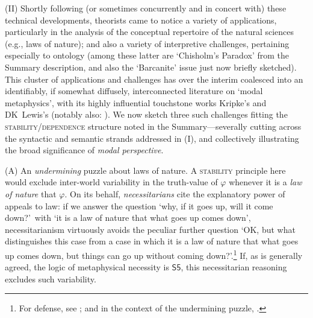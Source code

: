 \documentclass[12pt]{article}
\begin{document}
\smallskip{}

(II) Shortly following (or sometimes concurrently and in concert with) these
technical developments, theorists came to notice a variety of applications,
particularly in the analysis of the conceptual repertoire of the natural
sciences (e.g., laws of nature); and also a variety of interpretive challenges, pertaining especially
to ontology (among these latter are `Chisholm's Paradox' from the Summary
description, and also the `Barcanite' issue just now briefly sketched). This
cluster of applications and challenges has over the interim coalesced into an
identifiably, if somewhat diffusely, interconnected literature on `modal
metaphysics', with its highly influential touchstone works Kripke's
\citep{kripke72} and DK~Lewis's \citep{lewis86} (notably also:
\citep{Plantinga1974-PLATNO,VanInwagen1990-VANMB,sider01,finetime,Hawthorne2006-HAWME}).
We now sketch three such challenges fitting the
\textsc{stability}/\textsc{dependence} structure noted in the
Summary---severally cutting across the syntactic and semantic strands
addressed in (I), and collectively illustrating the broad significance of
\emph{modal perspective}.

(A) An \emph{undermining} puzzle about laws of nature. A \textsc{stability}
principle here would exclude inter-world variability in the truth-value of
$\varphi$ whenever it is a \emph{law of nature} that $\varphi$. 
On its behalf, \emph{necessitarians}
cite the explanatory power of appeals to law: if we answer the question `why,
if it goes up, will it come down?'\ with `it is a law of nature that what goes
up comes down', necessitarianism virtuously avoids the peculiar further
question `OK, but what distinguishes this case from a case in which 
it is a law of nature that what goes up comes down, but things can go up
without coming down?'.\footnote{For defense, see \citep{loewer96,loewer12};
and in the context of the undermining puzzle, \citep[p.~247]{finevn}.} If, as
is generally agreed, the logic of metaphysical necessity is $\mathsf{S5}$,
this necessitarian reasoning excludes such variability.
\end{document}
